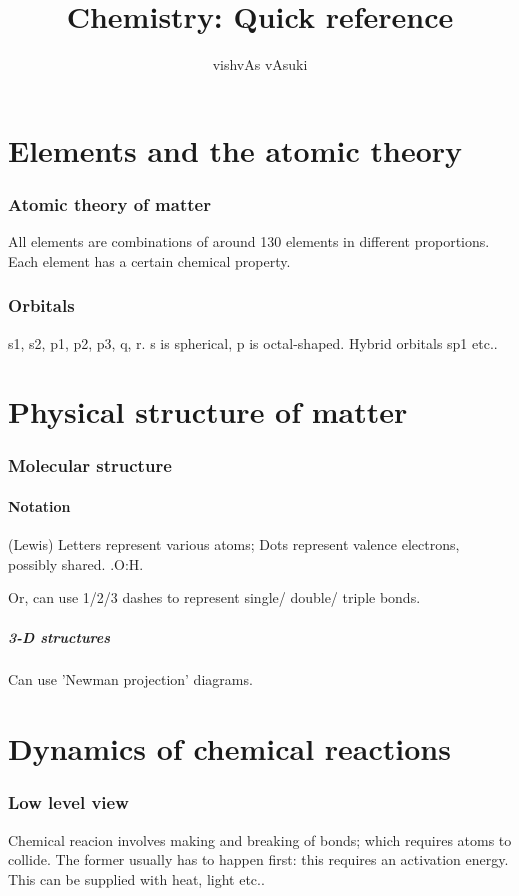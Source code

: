\documentclass{article}
\title{Chemistry: Quick reference}
\author{vishvAs vAsuki}
\begin{document}
\maketitle

\part{Elements and the atomic theory}
\section{Atomic theory of matter}
All elements are combinations of around 130 elements in different proportions. Each element has a certain chemical property.

\section{Orbitals}
s1, s2, p1, p2, p3, q, r. s is spherical, p is octal-shaped. Hybrid orbitals sp1 etc..

\part{Physical structure of matter}
\section{Molecular structure}
\subsection{Notation}
(Lewis) Letters represent various atoms; Dots represent valence electrons, possibly shared. .O:H.

Or, can use 1/2/3 dashes to represent single/ double/ triple bonds.

\subsubsection{3-D structures}
Can use 'Newman projection' diagrams.


\part{Dynamics of chemical reactions}
\section{Low level view}
Chemical reacion involves making and breaking of bonds; which requires atoms to collide. The former usually has to happen first: this requires an activation energy. This can be supplied with heat, light etc..
\end{document}
